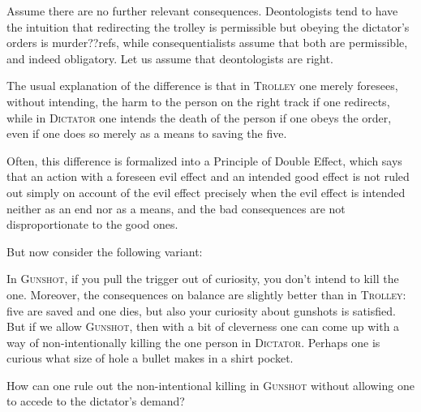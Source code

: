     
Assume there are no further relevant consequences.  Deontologists tend to have the intuition that redirecting 
the trolley is permissible but obeying the dictator's orders is murder??refs, while consequentialists assume 
that both are permissible, and indeed obligatory. Let us assume that deontologists are right.

The usual explanation of the difference is that in \textsc{Trolley} one merely foresees, without intending, the 
harm to the person on the right track if one redirects, while in \textsc{Dictator} one intends the death of the person
if one obeys the order, even if one does so merely as a means to saving the five. 

Often, this difference is formalized into a Principle of Double Effect, which says that an action with a foreseen
evil effect and an intended good effect is not ruled out simply on account of the evil effect precisely when 
the evil effect is intended neither as an end nor as a means, and the bad consequences are not disproportionate to the good ones.

But now consider the following variant:

In \textsc{Gunshot}, if you pull the trigger out of curiosity, you don't intend to kill the one. Moreover, the consequences
on balance are slightly better than in \textsc{Trolley}: five are saved and one dies, but also your curiosity about gunshots is
satisfied. But if we allow \textsc{Gunshot}, then with a bit of cleverness one can come up with a way of non-intentionally
killing the one person in \textsc{Dictator}. Perhaps one is curious what size of hole a bullet makes in a shirt pocket. 

How can one rule out the non-intentional killing in \textsc{Gunshot} without allowing one to accede to the dictator's demand? 

